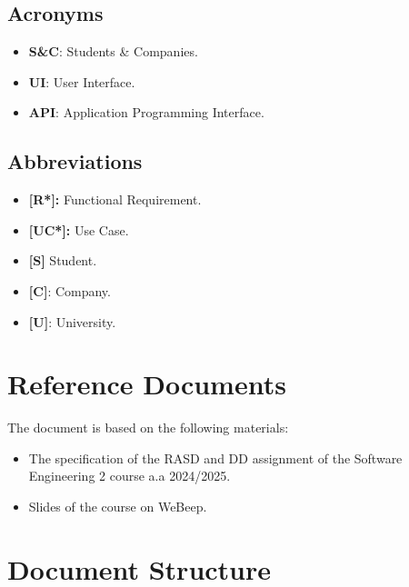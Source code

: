 \subsection{Acronyms}
\label{subsec:acronyms}%

\begin{itemize}
\item
  \textbf{S\&C}: Students \& Companies.
\item
  \textbf{UI}: User Interface.
\item
  \textbf{API}: Application Programming Interface.
\end{itemize}

\subsection{Abbreviations}
\label{subsec:abbreviations}%

\begin{itemize}
\item
  \textbf{[R*]:} Functional Requirement.
\item
  \textbf{[UC*]:} Use Case.
\item
  \textbf{[S]} Student.
\item
  \textbf{[C]}: Company.
\item
  \textbf{[U]}: University.
\end{itemize}




\section{Reference Documents}
\label{sec:reference_documents}%

The document is based on the following materials:

\begin{itemize}
\item
  The specification of the RASD and DD assignment of the Software Engineering 2 course a.a 2024/2025.
\item
  Slides of the course on WeBeep.
\end{itemize}

\section{Document Structure}
\label{sec:document_structure}%

